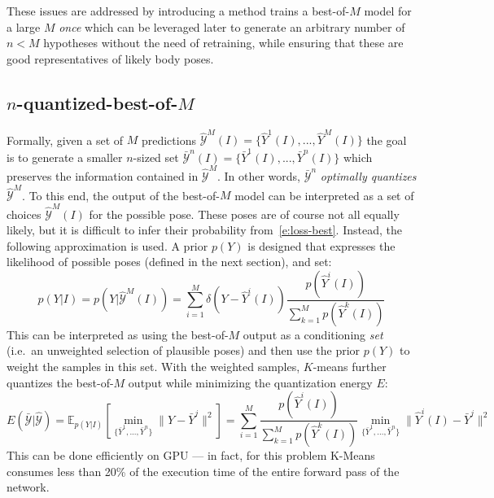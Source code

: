 These issues are addressed by introducing a method trains a best-of-$M$ model for a large $M$ \emph{once} which can be leveraged later to generate an arbitrary number of $n < M$ hypotheses without the need of retraining, while ensuring that these are good representatives of likely body poses.

\subsection{$n$-quantized-best-of-$M$}
Formally, given a set of $M$ predictions
$\mathcal{\hat Y}^M(I) = \{\hat Y^1(I), ..., \hat Y^M(I)\}$ the goal is to generate a smaller $n$-sized set
$\mathcal{\bar Y}^n(I) = \{\bar Y^1(I), ..., \bar Y^n(I)\}$ which preserves the information contained in $\mathcal{\hat Y}^M$.
In other words, $\mathcal{\bar Y}^n$ \emph{optimally quantizes} $\mathcal{\hat Y}^M$.
%
To this end, the output of the best-of-$M$ model can be interpreted as a set of choices $\mathcal{\hat Y}^M(I)$ for the possible pose.
These poses are of course not all equally likely, but it is difficult to infer their probability from~\eqref{e:loss-best}.
Instead, the following approximation is used.
A prior $p(Y)$ is designed that expresses the likelihood of possible poses (defined in the next section), and set:
\begin{equation}\label{e:conditional}
p(Y|I)
=
p(Y|\mathcal{\hat Y}^M(I))
=
\sum_{i=1}^{M}
\delta({Y} - \hat{Y}^i(I))
\frac{p(\hat{Y}^i(I))}{
\sum_{k=1}^{M} p(\hat{Y}^k(I))}
\end{equation}
This can be interpreted as using the best-of-$M$ output as a conditioning \emph{set} (i.e.~an unweighted selection of plausible poses) and then use the prior $p(Y)$ to weight the samples in this set.
With the weighted samples, $K$-means \cite{lloyd1982least} further quantizes the best-of-$M$ output while minimizing the quantization energy $E$:
\begin{equation}\label{e:loss-quant}
E(\mathcal{\bar Y} | \mathcal{\hat Y}) = \mathbb{E}_{p(Y|I)}
\left[
    \min_{\{\bar Y^1, ..., \bar Y^n\}} \| Y - \bar Y^j \|^2
\right]
=
\sum_{i=1}^{M}
\frac{p(\hat{Y}^i(I))}{
\sum_{k=1}^{M} p(\hat{Y}^k(I))}
\min_{\{\bar Y^1,\dots,\bar Y^n\}}
\| \hat Y^i(I) - \bar Y^j \|^2
\end{equation}
This can be done efficiently on GPU --- in fact, for this problem K-Means consumes less than 20\% of the execution time of the entire forward pass of the network. 

